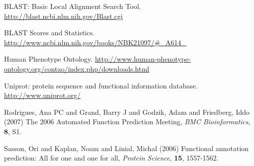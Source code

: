 \documentclass{bioinfo}
\begin{document}
\begin{thebibliography}{}

 BLAST: Basic Local Alignment Search Tool. \href{http://blast.ncbi.nlm.nih.gov/Blast.cgi}{http://blast.ncbi.nlm.nih.gov/Blast.cgi}

 BLAST Scores and Statistics. \href{http://www.ncbi.nlm.nih.gov/books/NBK21097/\#\_A614\_}{http://www.ncbi.nlm.nih.gov/books/NBK21097/\#\_A614\_}

 Human Phenotype Ontology. \href{http://www.human-phenotype-ontology.org/contao/index.php/downloads.html}{http://www.human-phenotype-ontology.org/contao/index.php/downloads.html}

 Uniprot: protein sequence and functional information database. \href{http://www.uniprot.org/}{http://www.uniprot.org/}

 Rodrigues, Ana PC and Grand, Barry J and Godzik, Adam and Friedberg, Iddo (2007) The 2006 Automated Function Prediction Meeting, {\it BMC Bioinformatics}, {\bf 8}, S1. %

 Sasson, Ori and Kaplan, Noam and Linial, Michal (2006) Functional annotation prediction: All for one and one for all, {\it Protein Science}, {\bf 15}, 1557-1562.

%
%
%
%
%
%

\end{thebibliography}
\end{document}

